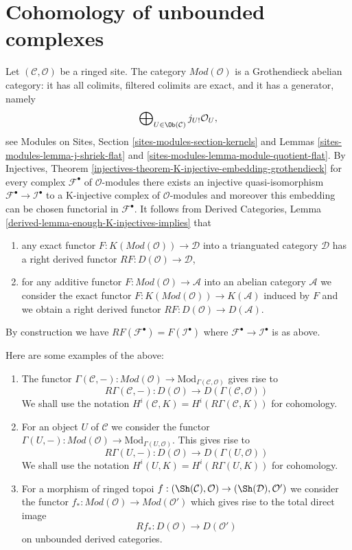\section{Cohomology of unbounded complexes}
\label{sites-cohomology-section-unbounded}
Let $(\mathcal{C}, \mathcal{O})$ be a ringed site.
The category $\textit{Mod}(\mathcal{O})$ is a Grothendieck
abelian category: it has all colimits,
filtered colimits are exact, and it has a generator, namely
$$
\bigoplus\nolimits_{U \in \Ob(\mathcal{C})} j_{U!}\mathcal{O}_U,
$$
see Modules on Sites, Section \ref{sites-modules-section-kernels} and
Lemmas \ref{sites-modules-lemma-j-shriek-flat} and
\ref{sites-modules-lemma-module-quotient-flat}.
By Injectives, Theorem
\ref{injectives-theorem-K-injective-embedding-grothendieck}
for every complex $\mathcal{F}^\bullet$ of $\mathcal{O}$-modules
there exists an injective quasi-isomorphism
$\mathcal{F}^\bullet \to \mathcal{I}^\bullet$ to a K-injective complex
of $\mathcal{O}$-modules and moreover this embedding can be chosen
functorial in $\mathcal{F}^\bullet$. It follows from
Derived Categories, Lemma \ref{derived-lemma-enough-K-injectives-implies}
that
\begin{enumerate}
\item any exact functor $F : K(\textit{Mod}(\mathcal{O})) \to \mathcal{D}$
into a trianguated category $\mathcal{D}$ has a right derived functor
$RF : D(\mathcal{O}) \to \mathcal{D}$,
\item for any additive functor
$F : \textit{Mod}(\mathcal{O}) \to \mathcal{A}$
into an abelian category $\mathcal{A}$ we consider the exact functor
$F : K(\textit{Mod}(\mathcal{O})) \to K(\mathcal{A})$ induced by $F$
and we obtain a right derived functor
$RF : D(\mathcal{O}) \to D(\mathcal{A})$.
\end{enumerate}
By construction we have $RF(\mathcal{F}^\bullet) = F(\mathcal{I}^\bullet)$
where $\mathcal{F}^\bullet \to \mathcal{I}^\bullet$ is as above.

\medskip\noindent
Here are some examples of the above:
\begin{enumerate}
\item The functor $\Gamma(\mathcal{C}, -) : \textit{Mod}(\mathcal{O}) \to
\text{Mod}_{\Gamma(\mathcal{C}, \mathcal{O})}$ gives rise to
$$
R\Gamma(\mathcal{C}, -) :
D(\mathcal{O})
\longrightarrow
D(\Gamma(\mathcal{C}, \mathcal{O}))
$$
We shall use the notation
$H^i(\mathcal{C}, K) = H^i(R\Gamma(\mathcal{C}, K))$ for cohomology.
\item For an object $U$ of $\mathcal{C}$ we consider the functor
$\Gamma(U, -) : \textit{Mod}(\mathcal{O}) \to
\text{Mod}_{\Gamma(U, \mathcal{O})}$. This gives rise to
$$
R\Gamma(U, -) : D(\mathcal{O}) \to D(\Gamma(U, \mathcal{O}))
$$
We shall use the notation
$H^i(U, K) = H^i(R\Gamma(U, K))$ for cohomology.
\item For a morphism of ringed topoi
$f : (\Sh(\mathcal{C}), \mathcal{O}) \to (\Sh(\mathcal{D}), \mathcal{O}')$
we consider the functor
$f_* : \textit{Mod}(\mathcal{O}) \to \textit{Mod}(\mathcal{O}')$
which gives rise to the total direct image
$$
Rf_* : D(\mathcal{O}) \longrightarrow D(\mathcal{O}')
$$
on unbounded derived categories.
\end{enumerate}

